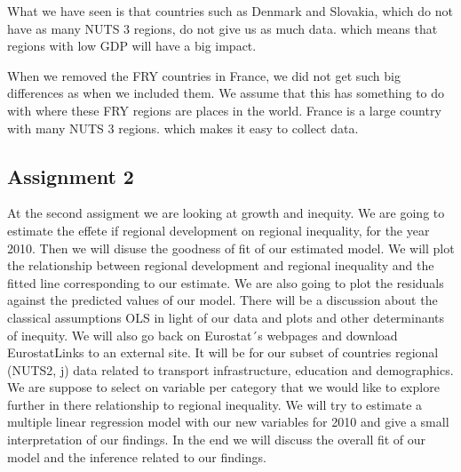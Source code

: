 \documentclass[
]{article}
\begin{document}
What we have seen is that countries such as Denmark and Slovakia, which
do not have as many NUTS 3 regions, do not give us as much data. which
means that regions with low GDP will have a big impact.

When we removed the FRY countries in France, we did not get such big
differences as when we included them. We assume that this has something
to do with where these FRY regions are places in the world. France is a
large country with many NUTS 3 regions. which makes it easy to collect
data.

\hypertarget{assignment-2}{%
\subsection{Assignment 2}\label{assignment-2}}

At the second assigment we are looking at growth and inequity. We are
going to estimate the effete if regional development on regional
inequality, for the year 2010. Then we will disuse the goodness of fit
of our estimated model. We will plot the relationship between regional
development and regional inequality and the fitted line corresponding to
our estimate. We are also going to plot the residuals against the
predicted values of our model. There will be a discussion about the
classical assumptions OLS in light of our data and plots and other
determinants of inequity. We will also go back on Eurostat´s webpages
and download EurostatLinks to an external site. It will be for our
subset of countries regional (NUTS2, j) data related to transport
infrastructure, education and demographics. We are suppose to select on
variable per category that we would like to explore further in there
relationship to regional inequality. We will try to estimate a multiple
linear regression model with our new variables for 2010 and give a small
interpretation of our findings. In the end we will discuss the overall
fit of our model and the inference related to our findings.
\end{document}
